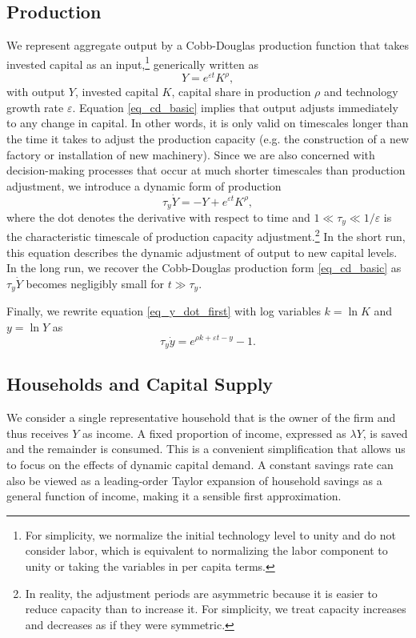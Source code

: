 \documentclass[authoryear, review]{elsarticle}
\begin{document}
\subsection{Production}\label{sec_model_production}
We represent aggregate output by a Cobb-Douglas production function that takes invested capital as an input,\footnote{
	For simplicity, we normalize the initial technology level to unity and do not consider labor, which is equivalent to normalizing the labor component to unity or taking the variables in per capita terms.
} generically written as 
\begin{equation}\label{eq_cd_basic}
    Y = e^{\varepsilon t}K^\rho,
\end{equation} 
with output $Y$, invested capital $K$, capital share in production $\rho$ and technology growth rate $\varepsilon$. 
Equation \eqref{eq_cd_basic} implies that output adjusts immediately to any change in capital. In other words, it is only valid on timescales longer than the time it takes to adjust the production capacity (e.g. the construction of a new factory or installation of new machinery). Since we are also concerned with decision-making processes that occur at much shorter timescales than production adjustment, we introduce a dynamic form of production 
\begin{equation}\label{eq_y_dot_first}
    \tau_y\dot{Y} = -Y + e^{\varepsilon t} K^\rho ,
\end{equation}
where the dot denotes the derivative with respect to time and $1\ll\tau_y\ll1/\varepsilon$ is the characteristic timescale of production capacity adjustment.\footnote{
	In reality, the adjustment periods are asymmetric because it is easier to reduce capacity than to increase it. For simplicity, we treat capacity increases and decreases as if they were symmetric.
} In the short run, this equation describes the dynamic adjustment of output to new capital levels. In the long run, we recover the Cobb-Douglas production form \eqref{eq_cd_basic} as $\tau_y\dot{Y}$ becomes negligibly small for $t\gg\tau_y$.

Finally, we rewrite equation \eqref{eq_y_dot_first} with log variables $k=\ln K$ and $y=\ln Y$ as
\begin{equation}\label{eq_y_dot}
    \tau_y \dot{y} = e^{\rho k + \varepsilon t - y} - 1.
\end{equation}

\subsection{Households and Capital Supply}\label{sec_model_household}
We consider a single representative household that is the owner of the firm and thus receives $Y$ as income. A fixed proportion of income, expressed as $\lambda Y$, is saved and the remainder is consumed. This is a convenient simplification that allows us to focus on the effects of dynamic capital demand. A constant savings rate can also be viewed as a leading-order Taylor expansion of household savings as a general function of income, making it a sensible first approximation.
\end{document}
